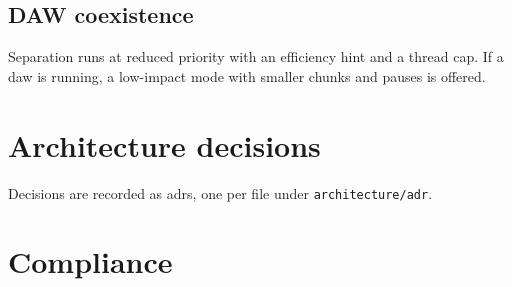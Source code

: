 \documentclass{covermaker}
\begin{document}
\section{DAW coexistence}
Separation runs at reduced priority with an efficiency hint and a thread cap. If a
\gls{daw} is running, a low-impact mode with smaller chunks and pauses is offered.

\chapter{Architecture decisions}
Decisions are recorded as \glspl{adr}, one per file under
\texttt{architecture/adr}.














\chapter{Compliance}\label{ch:compliance}
\end{document}
